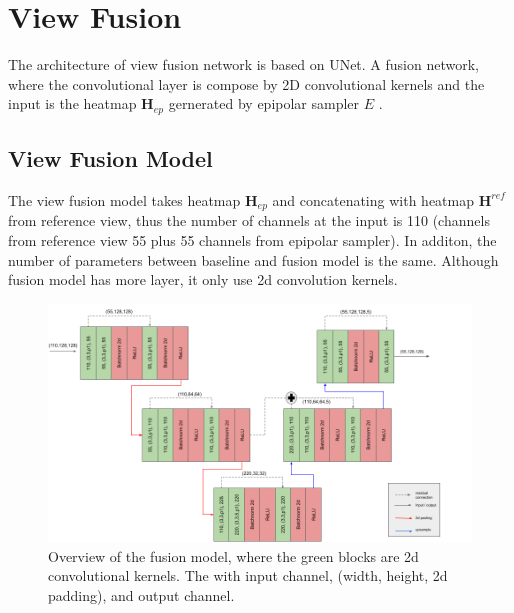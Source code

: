 \section{View Fusion}
The architecture of view fusion network is based on UNet. A fusion network, where the convolutional layer is compose by 2D convolutional kernels and the input is the heatmap $\mathbf{H}_{ep}$ gernerated by epipolar sampler $\mathit{E}$ . 
\subsection{View Fusion Model}
The view fusion model takes heatmap $\mathbf{H}_{ep}$ and concatenating with heatmap $\mathbf{H}^{ref}$ from reference view, thus the number of channels at the input is 110 (channels from reference view 55 plus 55 channels from epipolar sampler). In additon, the number of parameters between baseline and fusion model is the same. Although fusion model has more layer, it only use 2d convolution kernels. 
\begin{figure}
	\centering
	\includegraphics[width=1.0\columnwidth]{figures/ch4/view-fusion.png}
	\caption{Overview of the fusion model, where the green blocks are 2d convolutional kernels. The  with input channel, (width, height, 2d padding), and output channel.}
	\label{fig:view-baseline}
\end{figure}

